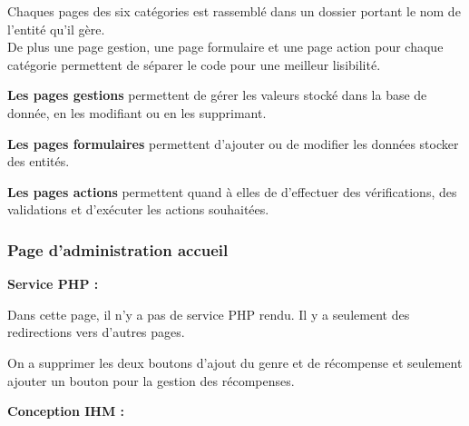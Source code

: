         \begin{paragraphe}
            Chaques pages des six catégories est rassemblé dans un dossier portant le nom de l'entité qu'il gère. \\
            De plus une page gestion, une page formulaire et une page action pour chaque catégorie permettent de séparer le code pour une meilleur lisibilité.
        \end{paragraphe}

        \begin{paragraphe}
            \textbf{Les pages gestions} permettent de gérer les valeurs stocké dans la base de donnée, en les modifiant ou en les supprimant.
        \end{paragraphe}
        
        \begin{paragraphe}
            \textbf{Les pages formulaires} permettent d'ajouter ou de modifier les données stocker des entités.
        \end{paragraphe}
        
        \begin{paragraphe}
            \textbf{Les pages actions} permettent quand à elles de d'effectuer des vérifications, des validations et d'exécuter les actions souhaitées.
        \end{paragraphe}

		\subsubsection{Page d'administration accueil}

			\begin{paragraphe}
				\textbf{Service PHP :}
			\end{paragraphe}

			\begin{paragraphe}
				Dans cette page, il n'y a pas de service PHP rendu. Il y a seulement des redirections vers d'autres pages.
			\end{paragraphe}

			\begin{paragraphe}
                On a supprimer les deux boutons d'ajout du genre et de récompense et seulement ajouter un bouton pour la gestion des récompenses.
			\end{paragraphe}
            
			\begin{paragraphe}
				\textbf{Conception IHM :}
			\end{paragraphe}

